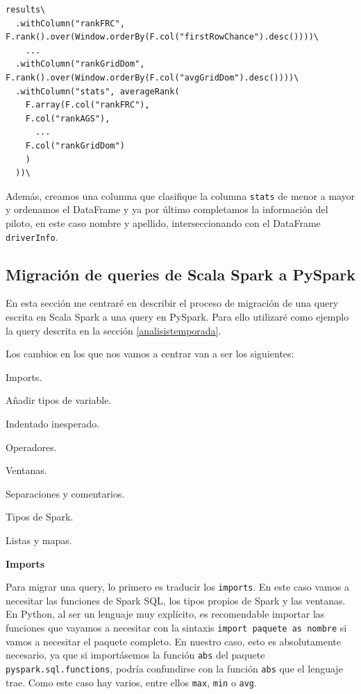 \documentclass[12pt,twoside,titlepage]{report}
\begin{document}
\begin{lstlisting}
results\
  .withColumn("rankFRC", F.rank().over(Window.orderBy(F.col("firstRowChance").desc())))\
    ...
  .withColumn("rankGridDom", F.rank().over(Window.orderBy(F.col("avgGridDom").desc())))\
  .withColumn("stats", averageRank(
    F.array(F.col("rankFRC"),
    F.col("rankAGS"),
      ...
    F.col("rankGridDom")
    )
  ))\
\end{lstlisting}

Además, creamos una columna que clasifique la columna \texttt{stats} de menor a mayor y ordenamos el DataFrame y ya por último completamos la información del piloto, en este caso nombre y apellido, interseccionando con el DataFrame \texttt{driverInfo}.


\subsection{Migración de queries de Scala Spark a PySpark}

En esta sección me centraré en describir el proceso de migración de una query escrita en Scala Spark a una query en PySpark. Para ello utilizaré como ejemplo la query descrita en la sección \ref{analisistemporada}.

Los cambios en los que nos vamos a centrar van a ser los siguientes:

\begin{compactitem}
	\item Imports.
	\item Añadir tipos de variable.
	\item Indentado inesperado.
	\item Operadores.
	\item Ventanas.
	\item Separaciones y comentarios.
	\item Tipos de Spark.
	\item Listas y mapas.
\end{compactitem}


\textbf{Imports}

Para migrar una query, lo primero es traducir los \texttt{imports}. En este caso vamos a necesitar las funciones de Spark SQL, los tipos propios de Spark y las ventanas. En Python, al ser un lenguaje muy explícito, es recomendable importar las funciones que vayamos a necesitar con la sintaxis \texttt{import {paquete} as {nombre}} si vamos a necesitar el paquete completo. En nuestro caso, esto es absolutamente necesario, ya que si importásemos la función \texttt{abs} del paquete \texttt{pyspark.sql.functions}, podría confundirse con la función \texttt{abs} que el lenguaje trae. Como este caso hay varios, entre ellos \texttt{max}, \texttt{min} o \texttt{avg}.
\end{document}
